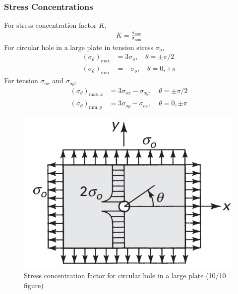 \subsubsection*{Stress Concentrations}
For stress concentration factor $K$,
\begin{align*}
    K = \frac{\sigma_{\text{max}}}{\sigma_{\text{nom}}}
\end{align*}
For circular hole in a large plate in tension stress $\sigma_o$,
\begin{align*}
    (\sigma_{\theta})_{\text{max}} &= 3 \sigma_o, \quad \theta = \pm \pi/2 \\
    (\sigma_{\theta})_{\text{min}} &= - \sigma_o, \quad \theta = 0, \pm \pi
\end{align*}
For tension $\sigma_{ox}$ and $\sigma_{oy}$,
\begin{align*}
    (\sigma_{\theta})_{\text{max}, x} &= 3 \sigma_{ox} - \sigma_{oy}, \quad \theta = \pm \pi/2 \\
    (\sigma_{\theta})_{\text{min}, y} &= 3 \sigma_{oy} - \sigma_{ox}, \quad \theta = 0, \pm \pi
\end{align*}
\begin{figure}[H]
    \centering
    \includegraphics[width=0.3\linewidth]{Figures/sec3 hole in large plate.png}
    \caption{Stress concentration factor for circular hole in a large plate (10/10 figure)}
    \label{fig:sec3 stress concentration for circular hole in large plate}
\end{figure}
